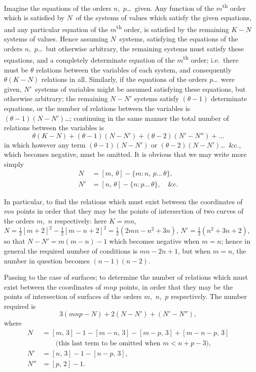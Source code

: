 \documentclass[11pt,a4paper]{book}
\begin{document}
Imagine the equations of the orders $n$,~$p$\ldots\ given. Any function of the $m$\textsuperscript{th} order which is satisfied by $N$~of the systems of values which satisfy the given equations, and any particular equation of the $m$\textsuperscript{th} order, is satisfied by the remaining $K-N$ systems of values. Hence assuming $N$~systems, satisfying the equations of the orders $n$,~$p$\ldots\ but otherwise arbitrary, the remaining systems must satisfy these equations, and a completely determinate equation of the $m$\textsuperscript{th} order; i.e.~there must be $\theta$ relations between the variables of each system, and consequently $\theta(K-N)$ relations in all. Similarly, if the equations of the orders $p$\ldots\ were given, $N'$~systems of variables might be assumed satisfying these equations, but otherwise arbitrary; the remaining $N-N'$ systems satisfy $(\theta-1)$ determinate equations, or the number of relations between the variables is $(\theta-1)(N-N')$\ldots; continuing in the same manner the total number of relations between the variables is
\[
\theta(K-N) + (\theta-1)(N-N') + (\theta-2)(N'-N'') + \ldots
\]
in which however any term $(\theta-1)(N-N')$ or $(\theta-2)(N-N')$\ldots\ \&c., which becomes negative, must be omitted. It is obvious that we may write more simply
\begin{align*}
N &= [m,\,\theta] - \{m : n,\, p\ldots\,\theta\},\\
N' &= [n,\,\theta] - \{n : p\ldots\,\theta\}, \quad \&\text{c.}
\end{align*}

\newpage
In particular, to find the relations which must exist between the coordinates of $mn$ points in order that they may be the points of intersection of two curves of the orders $m$,~$n$ respectively: here $K = mn$, $N = \frac{1}{2}[m+2]^2 - \frac{1}{2}[m-n+2]^2 = \frac{1}{2}(2mn - n^2 + 3n)$, $N' = \frac{1}{2}(n^2+3n+2)$, so that $N-N' = m(m-n)-1$ which becomes negative when $m=n$; hence in general the required number of conditions is $mn - 2n + 1$, but when $m=n$, the number in question becomes $(n-1)(n-2)$.

Passing to the case of surfaces; to determine the number of relations which must exist between the coordinates of $mnp$ points, in order that they may be the points of intersection of surfaces of the orders $m$,~$n$,~$p$ respectively. The number required is
\[
3(mnp - N) + 2(N-N') + (N'-N''),
\]
where
\begin{align*}
N &= [m,\,3] - 1 - [m-n,\,3] - [m-p,\,3] + [m-n-p,\,3] \\
  &\qquad\text{(this last term to be omitted when $m < n+p-3$),}\\
N' &= [n,\,3] - 1 - [n-p,\,3],\\
N'' &= [p,\,2] - 1.
\end{align*}
\end{document}
